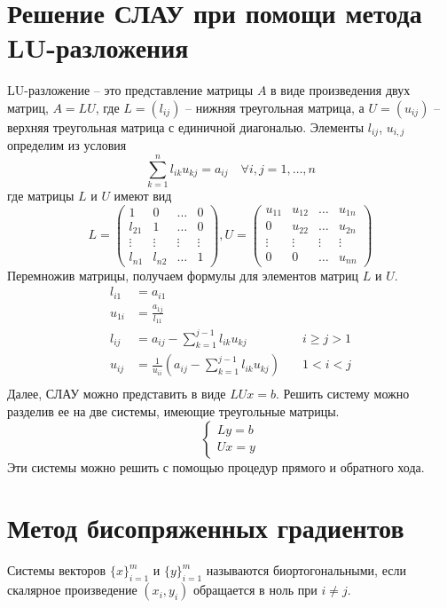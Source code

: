 \documentclass[a4paper, fontsize=14pt]{article}
\begin{document}
\section{Решение СЛАУ при помощи метода LU-разложения}

LU-разложение -- это представление матрицы $A$ в виде произведения двух матриц, $A=LU$, где
$L=(l_{ij})$ -- нижняя треугольная матрица, а $U=(u_{ij})$ -- верхняя треугольная матрица с
единичной диагональю. Элементы $l_{ij}$, $u_{i,j}$ определим из условия
$$\sum_{k=1}^{n}l_{ik}u_{kj} = a_{ij}\quad\forall i,j = 1,\dots,n$$
где матрицы $L$ и $U$ имеют вид 
$$L = 
\begin{pmatrix} 
    1 & 0 & \dots & 0 \\
    l_{21} & 1 & \dots & 0 \\
    \vdots & \vdots & \vdots &\vdots \\
    l_{n1} & l_{n2} & \dots & 1
\end{pmatrix}, 
U = 
\begin{pmatrix} 
    u_{11} & u_{12} & \dots & u_{1n} \\
    0 & u_{22} & \dots & u_{2n} \\
    \vdots & \vdots & \vdots &\vdots \\
    0 & 0 & \dots & u_{nn}
\end{pmatrix}
$$
Перемножив матрицы, получаем формулы для элементов матриц $L$ и $U$.
\begin{align*}
    l_{i1} &= a_{i1} \\
    u_{1i} &= \frac{a_{1j}}{l_{11}} \\
    l_{ij} &= a_{ij} - \sum_{k=1}^{j-1} l_{ik}u_{kj} \quad &i \ge j > 1\\
    u_{ij} &= \frac{1}{u_{ii}} \left(a_{ij} - \sum_{k=1}^{j-1} l_{ik}u_{kj}\right) \quad &1 < i < j\\
\end{align*}
Далее, СЛАУ можно представить в виде $LUx=b$. Решить систему можно разделив ее на две системы,
имеющие треугольные матрицы. 
$$
\begin{cases}
    Ly=b\\
    Ux=y
\end{cases}
$$
    Эти системы можно решить с помощью процедур прямого и обратного хода.\cite{kal}
\section{Метод бисопряженных градиентов}
    Системы векторов $\{x\}^m_{i=1}$ и $\{y\}^m_{i=1}$ называются
биортогональными, если скалярное произведение $(x_i , y_i)$ обращается в ноль при $i\neq j$.
\end{document}
